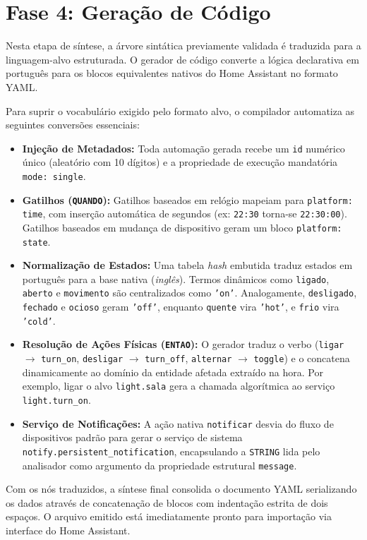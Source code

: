 \documentclass[12pt, a4paper]{article}
\begin{document}
\section{Fase 4: Geração de Código}
Nesta etapa de síntese, a árvore sintática previamente validada é traduzida para a linguagem-alvo estruturada. O gerador de código converte a lógica declarativa em português para os blocos equivalentes nativos do Home Assistant no formato YAML.

Para suprir o vocabulário exigido pelo formato alvo, o compilador automatiza as seguintes conversões essenciais:
\begin{itemize}
    \item \textbf{Injeção de Metadados:} Toda automação gerada recebe um \texttt{id} numérico único (aleatório com 10 dígitos) e a propriedade de execução mandatória \texttt{mode: single}.
    \item \textbf{Gatilhos (\texttt{QUANDO}):} Gatilhos baseados em relógio mapeiam para \texttt{platform: time}, com inserção automática de segundos (ex: \texttt{22:30} torna-se \texttt{22:30:00}). Gatilhos baseados em mudança de dispositivo geram um bloco \texttt{platform: state}.
    \item \textbf{Normalização de Estados:} Uma tabela \textit{hash} embutida traduz estados em português para a base nativa (\textit{inglês}). Termos dinâmicos como \texttt{ligado}, \texttt{aberto} e \texttt{movimento} são centralizados como \texttt{'on'}. Analogamente, \texttt{desligado}, \texttt{fechado} e \texttt{ocioso} geram \texttt{'off'}, enquanto \texttt{quente} vira \texttt{'hot'}, e \texttt{frio} vira \texttt{'cold'}.
    \item \textbf{Resolução de Ações Físicas (\texttt{ENTAO}):} O gerador traduz o verbo (\texttt{ligar} $\rightarrow$ \texttt{turn\_on}, \texttt{desligar} $\rightarrow$ \texttt{turn\_off}, \texttt{alternar} $\rightarrow$ \texttt{toggle}) e o concatena dinamicamente ao domínio da entidade afetada extraído na hora. Por exemplo, ligar o alvo \texttt{light.sala} gera a chamada algorítmica ao serviço \texttt{light.turn\_on}.
    \item \textbf{Serviço de Notificações:} A ação nativa \texttt{notificar} desvia do fluxo de dispositivos padrão para gerar o serviço de sistema \texttt{notify.persistent\_notification}, encapsulando a \texttt{STRING} lida pelo analisador como argumento da propriedade estrutural \texttt{message}.
\end{itemize}

Com os nós traduzidos, a síntese final consolida o documento YAML serializando os dados através de concatenação de blocos com indentação estrita de dois espaços. O arquivo emitido está imediatamente pronto para importação via interface do Home Assistant.
\end{document}
